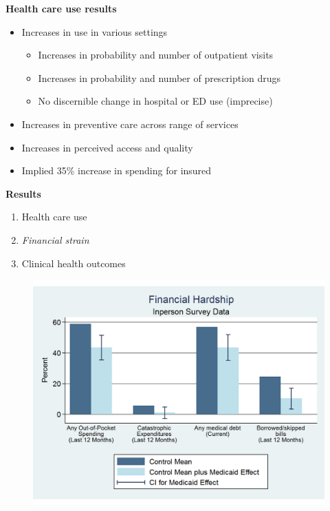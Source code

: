 \documentclass[notes=show]{beamer}
\begin{document}
		
\begin{frame}[plain]
	\begin{center}
	\textbf{Health care use results}
	\end{center}
	
	\begin{itemize}
	\item Increases in use in various settings
		\begin{itemize}
		\item Increases in probability and number of outpatient visits
		\item Increases in probability and number of prescription drugs
		\item No discernible change in hospital or ED use (imprecise)
		\end{itemize}
	\item Increases in preventive care across range of services
	\item Increases in perceived access and quality
	\item Implied 35\% increase in spending for insured
	\end{itemize}
\end{frame}		


\begin{frame}[plain]
	\begin{center}
	\textbf{Results}
	\end{center}
	
	\begin{enumerate}
	\item Health care use
	\item \emph{Financial strain}
	\item Clinical health outcomes
	\end{enumerate}
	
\end{frame}

\begin{frame}[plain]
	
	\begin{figure}
	\includegraphics[scale=0.40]{./lecture_includes/baicker_13.pdf}
	\end{figure}
\end{frame}
\end{document}
